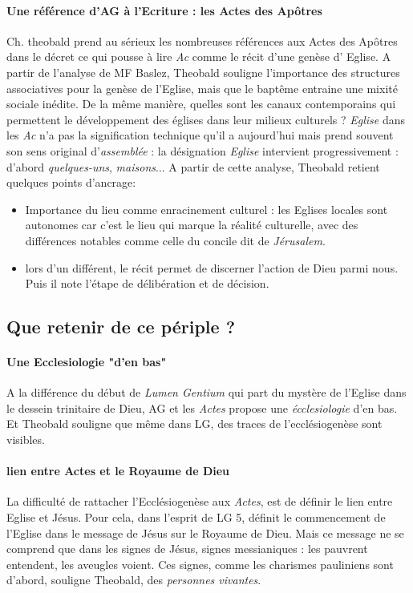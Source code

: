 \paragraph{Une référence d'AG à l'Ecriture : les Actes des Apôtres} Ch. theobald prend au sérieux les nombreuses références aux Actes des Apôtres dans le décret ce qui pousse à lire \textit{Ac} comme le récit d'une genèse d' Eglise. A partir de l'analyse de MF Baslez, Theobald souligne l'importance des structures associatives pour la genèse de l'Eglise, mais que le baptême entraine une mixité sociale inédite. De la même manière, quelles sont les canaux contemporains qui permettent le développement des églises dans leur milieux culturels ? \textit{Eglise} dans les \textit{Ac} n'a pas la signification technique qu'il a aujourd'hui mais prend souvent son sens original d'\textit{assemblée} : la désignation \textit{Eglise} intervient progressivement : d'abord \textit{quelques-uns}, \textit{maisons}...
A partir de cette analyse, Theobald retient quelques points d'ancrage: 
\begin{itemize}
    \item Importance du lieu comme enracinement culturel : les Eglises locales sont autonomes car c'est le lieu qui marque la réalité culturelle, avec des différences notables comme celle du concile dit de \textit{Jérusalem}.
    \item lors d'un différent, le récit permet de discerner l'action de Dieu parmi nous. Puis il note l'étape de délibération et de décision.
    
\end{itemize}

\subsection{Que retenir de ce périple ?}
\paragraph{Une Ecclesiologie "d'en bas"} A la différence du début de \textit{Lumen Gentium} qui part du mystère de l'Eglise dans le dessein trinitaire de Dieu, AG et les \textit{Actes} propose une \textit{écclesiologie} d'en bas. Et Theobald souligne que même dans LG, des traces de l'ecclésiogenèse sont visibles.

\paragraph{lien entre Actes et le Royaume de Dieu} La difficulté de rattacher l'Ecclésiogenèse aux \textit{Actes}, est de définir le lien entre Eglise et Jésus.  Pour cela, dans l'esprit de LG 5, définit le commencement de l'Eglise dans le message de Jésus sur le Royaume de Dieu. Mais ce message ne se comprend que dans les signes de Jésus, signes messianiques : les pauvrent entendent, les aveugles voient.
Ces signes, comme les charismes pauliniens sont d'abord, souligne Theobald, des \textit{personnes vivantes}.

